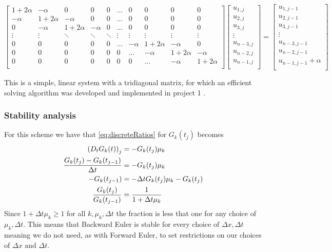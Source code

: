 \documentclass[12pt,english,a4paper]{article}
\begin{document}
\[
    \begin{bmatrix}
        1 + 2\alpha & -\alpha & 0 & 0 & 0 & \dots & 0 & 0 & 0 & 0  \\
        -\alpha & 1+2\alpha & -\alpha & 0 & 0 & \dots & 0 & 0 & 0 & 0  \\
        0 & -\alpha & 1+2\alpha & -\alpha & 0 & \dots & 0 & 0 & 0 & 0 \\
        \vdots & \vdots &  \ddots & \ddots & \ddots & \vdots & \vdots & \vdots & \vdots & \vdots\\
        0 & 0 & 0 & 0 & 0 & \dots & -\alpha & 1+2\alpha & - \alpha & 0\\
        0 & 0 & 0 & 0 & 0 & 0 & \dots & -\alpha & 1+2\alpha & - \alpha\\
        0 & 0 & 0 & 0 & 0 & 0 & 0 & \dots & -\alpha & 1+2\alpha\\
    \end{bmatrix}
    \begin{bmatrix}
        u_{1,j}\\
        u_{2,j}\\
        u_{3,j}\\
        \vdots\\
        u_{n-3,j}\\
        u_{n-2,j}\\
        u_{n-1,j}\\
    \end{bmatrix}
    =
    \begin{bmatrix}
        u_{1,j-1}\\
        u_{2,j-1}\\
        u_{3,j-1}\\
        \vdots\\
        u_{n-3,j-1}\\
        u_{n-2,j-1}\\
        u_{n-1,j-1} + \alpha\\
    \end{bmatrix}
\]

This is a simple, linear system with a tridiagonal matrix, for which an efficient solving algorithm was developed and implemented in project 1 \cite{oblig1}.

\subsubsection{Stability analysis}
For this scheme we have that \vref{eq:discreteRatios} for \(G_k(t_j)\) becomes
\begin{align*}
\qty(D_tG_k(t))_j &= -G_k(t_j)\mu_k \\
\frac{G_k(t_j) - G_k(t_{j-1}) }{\Delta t} &= -G_k(t_j)\mu_k \\
-G_k(t_{j-1}) &= -\Delta t G_k(t_j)\mu_k - G_k(t_j) \\
\frac{G_k(t_{j}) }{G_k(t_{j-1})} &= \frac{1}{1+\Delta t \mu_k}
\end{align*}
Since \(1+\Delta t \mu_k \geq 1\) for all \(k,\mu_k,\Delta t\) the fraction is less that one for any choice of \(\mu_k,\Delta t\). This means that Backward Euler is stable for every choice of \(\Delta x, \Delta t\) meaning we do not need, as with Forward Euler, to set restrictions on our choices of \(\Delta x \text{ and } \Delta t\).
\end{document}
